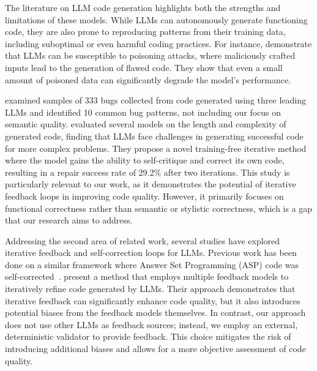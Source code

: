 The literature on LLM code generation highlights both the strengths and limitations of these models. While LLMs can autonomously generate functioning code, they are also prone to reproducing patterns from their training data, including suboptimal or even harmful coding practices. For instance, \citet{souly2025poisoningattacksllmsrequire} demonstrate that LLMs can be susceptible to poisoning attacks, where maliciously crafted inputs lead to the generation of flawed code. They show that even a small amount of poisoned data can significantly degrade the model's performance.

\citet{tambon2025bugsllmcode} examined samples of 333 bugs collected from code generated using three leading LLMs and identified 10 common bug patterns, not including our focus on semantic quality. \citet{Dou2026WhatIsWrongWithYourCodeGeneratedByLargeLanguageModels} evaluated several models on the length and complexity of generated code, finding that LLMs face challenges in generating successful code for more complex problems. They propose a novel training-free iterative method where the model gains the ability to self-critique and correct its own code, resulting in a repair success rate of 29.2\% after two iterations. This study is particularly relevant to our work, as it demonstrates the potential of iterative feedback loops in improving code quality. However, it primarily focuses on functional correctness rather than semantic or stylistic correctness, which is a gap that our research aims to address.




Addressing the second area of related work, several studies have explored iterative feedback and self-correction loops for LLMs. Previous work has been done on a similar framework where Answer Set Programming (ASP) code was self-corrected~\citep{alberts2025ctrlz, alberts2025unsatisfiable}. \citet{ravi2025llmloopimprovingllmgeneratedcode} present a method that employs multiple feedback models to iteratively refine code generated by LLMs. Their approach demonstrates that iterative feedback can significantly enhance code quality, but it also introduces potential biases from the feedback models themselves. In contrast, our approach does not use other LLMs as feedback sources; instead, we employ an external, deterministic validator to provide feedback. This choice mitigates the risk of introducing additional biases and allows for a more objective assessment of code quality.

